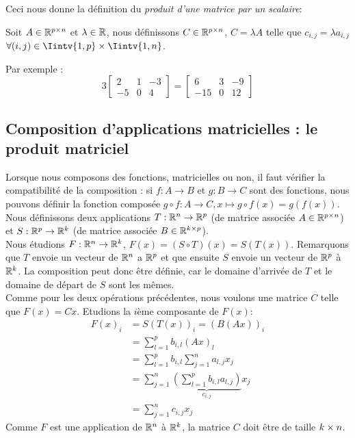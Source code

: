 \noindent Ceci nous donne la définition du \textit{produit d'une matrice par un scalaire}:
\begin{boxdef}
Soit $A \in \mathbb{R} ^{p \times n}$ et $\lambda \in \mathbb{R}$, nous définissons $C \in \mathbb{R} ^{p \times n}$, $C=\lambda A$ telle que $c_{i,j} = \lambda a_{i,j}$ $\forall (i,j) \in \Iintv{1,p} \times \Iintv{1, n}$.
\end{boxdef}
Par exemple :
$$3\begin{bmatrix} 2 & 1 & -3 \\ -5 & 0 & 4 \end{bmatrix} = \begin{bmatrix} 6 & 3 & -9 \\ -15 & 0 & 12 \end{bmatrix}
$$

\subsection{Composition d'applications matricielles : le produit matriciel}
\noindent Lorsque nous composons des fonctions, matricielles ou non, il faut vérifier la compatibilité de la composition : si $f: A \to B$ et $g : B \to C$ sont des fonctions, nous pouvons définir la fonction composée $g \circ f : A \to C, x \mapsto g \circ f(x) = g(f(x))$.\\

\noindent Nous définissons deux applications $T: \mathbb{R} ^n \to \mathbb{R}^p$ (de matrice associée $A \in \mathbb{R}^{p \times n}$) et $S: \mathbb{R} ^p \to \mathbb{R}^k$ (de matrice associée $B \in \mathbb{R}^{k \times p}$). \\

\noindent Nous étudions $F: \mathbb{R}^n \to \mathbb{R}^k$, $F(x) = (S \circ T)(x) = S(T(x))$. Remarquons que $T$ envoie un vecteur de $\mathbb{R}^n$ a $\mathbb{R}^p$ et que ensuite $S$ envoie un vecteur de $\mathbb{R}^p$ à $\mathbb{R}^k$. La composition peut donc être définie, car le domaine d'arrivée de $T$ et le domaine de départ de $S$ sont les mêmes. \\

\noindent Comme pour les deux opérations précédentes, nous voulons une matrice $C$ telle que $F(x) = Cx$. Etudions la $i$ème composante de $F(x)$:
\begin{align*}
    F(x)_i &= S(T(x))_i = (B(Ax))_i \\
    &= \sum_{l=1}^{p} b_{i,l} (Ax)_l \\
    &= \sum_{l=1}^{p} b_{i,l} \sum_{j=1}^n a_{l,j} x_j \\
    &= \sum_{j=1}^{n} \underbrace{\left( \sum_{l=1}^{p} b_{i,l} a_{l,j} \right)}_{c_{i,j}} x_j \\
    &= \sum_{j=1}^{n} c_{i,j} x_j
\end{align*}
Comme $F$ est une application de $\mathbb{R}^n$ à $\mathbb{R}^k$, la matrice $C$ doit être de taille $k \times n$.\\

